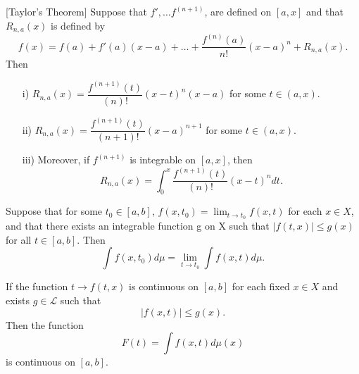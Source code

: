 \begin{theorem}\citep[Thm.4, p.~391]{}[Taylor's Theorem]
    Suppose that $f', \ldots f^{(n+1)}$, are defined on $[a,x]$ and 
    that $R_{n,a}(x)$ is defined by
    $$
        f(x) = f(a) + f'(a)(x-a) + \dots +
        \frac{f^{(n)}(a)}{n!}(x-a)^{n} + R_{n,a}(x). 
    $$
    Then
    \begin{enumerate}
        \item[i)]
            $R_{n,a}(x) = \dfrac{f^{(n+1)}(t)}{(n)!}(x-t)^{n}(x-a)$ for some 
            $t \in (a,x)$.
        \item[ii)]
            $R_{n,a}(x) = \dfrac{f^{(n+1)}(t)}{(n+1)!}(x-a)^{n+1}$ for some 
            $t \in (a,x)$.
        \item[iii)]
            Moreover, if $f^{(n+1)}$ is integrable on $[a,x]$, then
            $$
                R_{n,a}(x) = \int_{0}^{x}\dfrac{f^{(n+1)}(t)}{(n)!}(x-t)^{n} dt.
            $$
    \end{enumerate}
\end{theorem}
\begin{theorem}[Lagrange]
    
\end{theorem}
\begin{corollary}
    Suppose that for some $t_0 \in [a,b]$, $f(x,t_0) = \lim_{t \to t_0} f(x,t)$
    for each $x \in X$, and that there exists an integrable function g on X 
    such that $|f(t,x)| \leq g(x)$ for all $t\in[a,b]$. Then 
    $$
        \int{f(x,t_0)}d\mu = \lim_{t \to t_0} \int{f(x,t)}d\mu. 
    $$
\end{corollary}

\begin{corollary}
    If the function $t \to f(t,x)$ is continuous on $[a,b]$ for each fixed 
    $x \in X$ and exists $g \in \mathscr{L}$ such that 
    $$
        |f(x,t)| \leq g(x).
    $$
    Then the function
    $$
        F(t) = \displaystyle \int f(x,t)d\mu(x)
    $$
    is continuous on $[a,b]$.
\end{corollary}


